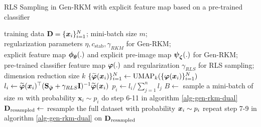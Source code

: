 \begin{algorithm}[H]
\caption{RLS Sampling in Gen-RKM with explicit feature map based on a pre-trained classifier}
\label{alg-rls-rkm-fixed}
\begin{algorithmic}[1]
\Require training data $\mathbf{D} = \{\boldsymbol{x}_i\}_{i=1}^{N}$; mini-batch size $m$; \\
regularization parameters $\eta, c_{\text{stab}}, \gamma_{RKM}$ for Gen-RKM; \\
explicit feature map $\boldsymbol{\phi}_{\boldsymbol{\theta}}(.)$ and explicit pre-image map $\boldsymbol{\psi}_{\boldsymbol{\zeta}}(.)$ for Gen-RKM; \\
pre-trained classifier feature map $\boldsymbol{\varphi}(.)$ and regularization $\gamma_{RLS}$ for RLS sampling; \\
dimension reduction size $k$
\State $\{\widetilde{\boldsymbol{\varphi}}(\boldsymbol{x}_i)\}_{i=1}^{N} \gets \text{UMAP}_{k}(\{\boldsymbol{\varphi}(\boldsymbol{x}_i)\}_{i=1}^{N})$ 
\State $l_i \gets \widetilde{\boldsymbol{\varphi}}(\boldsymbol{x}_i)^\top(\mathbf{S}_{\Tilde{\boldsymbol{\varphi}}}+\gamma_{RLS}\mathbf{I})^{-1}\widetilde{\boldsymbol{\varphi}}(\boldsymbol{x}_i)$ 
\State $p_i \gets l_i / \sum_{j=1}^n l_j$
        \State $B \gets$ sample a mini-batch of size $m$ with probability $\boldsymbol{x}_i \sim p_i$ 
        \State do step 6-11 in algorithm \ref{alg-gen-rkm-dual}
        \EndFor
    \EndFor
{}
\State $\mathbf{D}_{\text{resampled}} \gets$ resample the full dataset with probability $\boldsymbol{x}_i \sim p_i$ 
\State repeat step 7-9 in algorithm \ref{alg-gen-rkm-dual}  on $\mathbf{D}_{\text{resampled}}$
\end{algorithmic}
\end{algorithm}